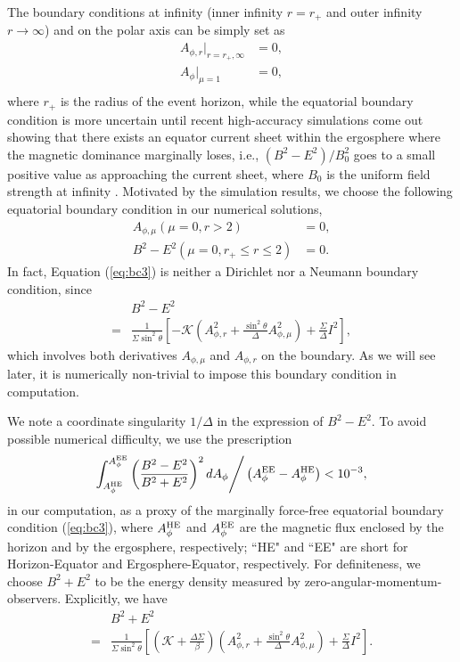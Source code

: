 \documentclass[aps,prd,reprint,nofootinbib, superscriptaddress]{revtex4-1}
\def\sst{\sin^2\theta}
\def\Ar{A_{\phi,r}}
\def\Am{A_{\phi,\mu}}
\def\be{\begin{equation}}
\def\ee{\end{equation}}
\def\AHE{A_\phi^{\rm HE}}
\def\AEE{A_\phi^{\rm EE}}
\begin{document}
The boundary conditions at infinity (inner infinity $r=r_+$ and outer infinity $r\rightarrow\infty$)
and on the polar axis can be simply set as
\be
\begin{aligned}
\Ar|_{r=r_+, \infty} &= 0, \\
A_\phi|_{\mu = 1} &= 0,\\
\end{aligned}
\ee
where $r_+$ is the radius of the event horizon,
while the equatorial boundary condition is more uncertain until recent high-accuracy simulations
come out showing that there exists an equator current sheet within the ergosphere where the
magnetic dominance marginally loses, i.e., $(B^2-E^2)/B_0^2$ goes to a small positive value
as approaching the current sheet, where $B_0$ is the uniform field strength at infinity  \cite{East2018}. Motivated by the simulation results,
we choose the following equatorial boundary condition in our numerical solutions,
\begin{subequations}
\begin{align}
    \Am(\mu = 0, r > 2) &= 0, \label{eq:bc2}\\
    B^2-E^2 (\mu = 0, r_+ \leq r \leq 2) &=0.\label{eq:bc3}
\end{align}
\end{subequations}
In fact, Equation (\ref{eq:bc3})
is neither a Dirichlet nor a Neumann boundary condition, since
\be
\begin{aligned}
&B^2-E^2 \\
= & \frac{1}{\Sigma \sst} \left[ -\mathcal{K} \left(\Ar^2 +\frac{\sst}{\Delta}\Am^2 \right)+\frac{\Sigma}{\Delta}I^2\right],
\end{aligned}
\ee
which involves both derivatives $\Am$ and $\Ar$ on the boundary.
As we will see later, it is numerically non-trivial to impose this boundary condition in computation.

We note a coordinate singularity $1/\Delta$ in the expression of $B^2-E^2$.
To avoid possible numerical difficulty, we use the prescription
\be
\label{eq:nbc}
\int_{A_\phi^{\rm HE}}^{A_\phi^{\rm EE}} \left(\frac{B^2-E^2}{B^2+E^2}\right)^2 dA_\phi \Bigg/ \left(A_\phi^{\rm EE}- A_\phi^{\rm HE}\right)  < 10^{-3},
\ee
in our computation, as a proxy of the marginally force-free equatorial boundary condition (\ref{eq:bc3}),
where $\AHE$ and $\AEE$ are the magnetic flux enclosed by the horizon and by the ergosphere, respectively;
``HE" and ``EE" are short for Horizon-Equator and Ergosphere-Equator, respectively.
For definiteness, we choose $B^2+E^2$ to be the energy density measured by zero-angular-momentum-observers.
Explicitly, we have
\be
\begin{aligned}
 & B^2+E^2   \\
=& \frac{1}{\Sigma \sst} \left[ \left(\mathcal{K}+\frac{\Delta\Sigma}{\beta} \right)
 \left(\Ar^2 +\frac{\sst}{\Delta}\Am^2 \right)
 +\frac{\Sigma}{\Delta}I^2\right] .
\end{aligned}
\ee
\end{document}
